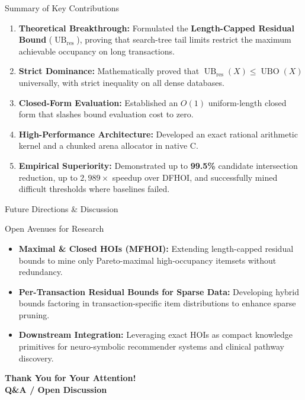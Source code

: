 \documentclass[aspectratio=169,10pt]{beamer}
\newcommand{\DFHOI}{\textsc{DFHOI}}
\newcommand{\UBO}{\operatorname{UBO}}
\newcommand{\UBres}{\operatorname{UB}_{\text{res}}}
\begin{document}
\begin{frame}{Summary of Key Contributions}
  \begin{enumerate}
    \item \textbf{Theoretical Breakthrough:} Formulated the \textbf{Length-Capped Residual Bound} ($\UBres$), proving that search-tree tail limits restrict the maximum achievable occupancy on long transactions.
    \item \textbf{Strict Dominance:} Mathematically proved that $\UBres(X) \le \UBO(X)$ universally, with strict inequality on all dense databases.
    \item \textbf{Closed-Form Evaluation:} Established an $O(1)$ uniform-length closed form that slashes bound evaluation cost to zero.
    \item \textbf{High-Performance Architecture:} Developed an exact rational arithmetic kernel and a chunked arena allocator in native C.
    \item \textbf{Empirical Superiority:} Demonstrated up to \textbf{99.5\%} candidate intersection reduction, up to \textbf{$2,989\times$} speedup over \DFHOI{}, and successfully mined difficult thresholds where baselines failed.
  \end{enumerate}
\end{frame}

\begin{frame}{Future Directions \& Discussion}
  \begin{block}{Open Avenues for Research}
    \begin{itemize}
      \item \textbf{Maximal \& Closed HOIs (MFHOI):} Extending length-capped residual bounds to mine only Pareto-maximal high-occupancy itemsets without redundancy.
      \item \textbf{Per-Transaction Residual Bounds for Sparse Data:} Developing hybrid bounds factoring in transaction-specific item distributions to enhance sparse pruning.
      \item \textbf{Downstream Integration:} Leveraging exact HOIs as compact knowledge primitives for neuro-symbolic recommender systems and clinical pathway discovery.
    \end{itemize}
  \end{block}

  \vspace{0.4cm}
  \begin{center}
    {\Large\textbf{Thank You for Your Attention!}}\\[0.3cm]
    {\normalsize\textbf{Q\&A / Open Discussion}}
  \end{center}
\end{frame}
\end{document}
